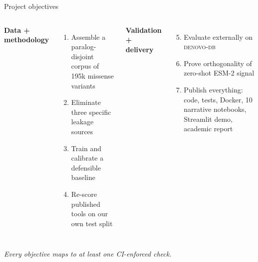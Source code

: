 
\begin{frame}{Project objectives}
  \begin{columns}[T]
    \textbf{Data + methodology}
    \begin{enumerate}
      \item Assemble a paralog-disjoint corpus of 195k missense variants
      \item Eliminate three specific leakage sources
      \item Train and calibrate a defensible baseline
      \item Re-score published tools on our own test split
    \end{enumerate}

    \textbf{Validation + delivery}
    \begin{enumerate}\setcounter{enumi}{4}
      \item Evaluate externally on \textsc{denovo-db}
      \item Prove orthogonality of zero-shot ESM-2 signal
      \item Publish everything: code, tests, Docker, 10 narrative
            notebooks, Streamlit demo, academic report
    \end{enumerate}
  \end{columns}

  \vspace{0.7em}
  \centering
  \footnotesize
  \emph{Every objective maps to at least one CI-enforced check.}
\end{frame}




